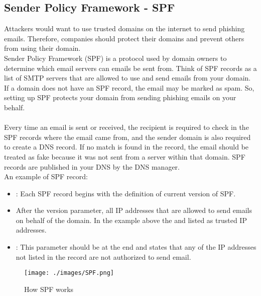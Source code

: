 \subsection{Sender Policy Framework - SPF}
Attackers would want to use trusted domains on the internet to send phishing emails. Therefore, companies should protect their domains and prevent others from using their domain. \\
Sender Policy Framework (SPF) is a protocol used by domain owners to determine which email servers can emails be sent from. Think of SPF records as a list of SMTP servers that are allowed to use and send emails from your domain. 
If a domain does not have an SPF record, the email may be marked as spam. 
So, setting up SPF protects your domain from sending phishing emails on your behalf. \\
\\
Every time an email is sent or received, the recipient is required to check in the SPF records where the email came from, and the sender domain is also required to create a DNS record.
If no match is found in the record, the email should be treated as fake because it was not sent from a server within that domain. 
SPF records are published in your DNS by the DNS manager. \\
An example of SPF record: \\
\begin{center}
\end{center}

\begin{itemize}
    \item {}:  Each SPF record begins with the definition of current version of SPF.
    \item After the version parameter, all IP addresses that are allowed to send emails on behalf of the domain. 
    In the example above the  and  listed as trusted IP addresses.
    \item {}: This parameter should be at the end and states that any of the IP addresses not listed in the record are not authorized to send email.
\end{itemize}

\begin{figure}[H]
    \centering
    \texttt{[image: ./images/SPF.png]}
    \caption{How SPF works}
\end{figure}


